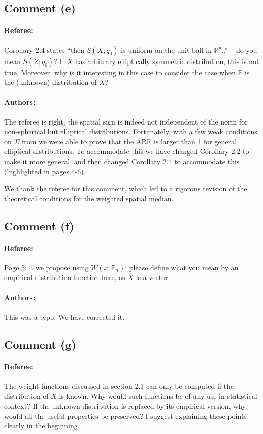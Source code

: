 \documentclass[11pt,letterpaper]{article}
\newcommand{\BF}{{\mathbb{F}}}
\newcommand{\BR}{{\mathbb{R}}}
\theoremstyle{definition} \newtheorem{Definition}[Theorem]{Definition}
\begin{document}
\subsection*{Comment (e)}
\paragraph{Referee:}
Corollary 2.4 states “then $S(X; q_0)$ is uniform on the unit ball in $\BR^p$..” – do you mean $S(Z; q_0)$? If $X$ has arbitrary elliptically symmetric distribution, this is not true. Moreover, why is it interesting in this case to consider the case when $\BF$ is the (unknown) distribution of $X$?

\paragraph{Authors:}
The referee is right, the spatial sign is indeed not independent of the norm for non-spherical but elliptical distributions. Fortunately, with a few weak conditions on $\Sigma$ from \cite{ref:JASA151658_WangPengLi} we were able to prove that the ARE is larger than 1 for general elliptical distributions. To accommodate this we have changed Corollary 2.2 to make it more general, and then changed Corollary 2.4 to accommodate this (highlighted in pages 4-6).

We thank the referee for this comment, which led to a rigorous revision of the theoretical conditions for the weighted spatial median.

\subsection*{Comment (f)}
\paragraph{Referee:}
Page 5: “..we propose using $W(x; \BF_n)$: please define what you mean by an empirical distribution function here, as $X$ is a vector.

\paragraph{Authors:}
This was a typo. We have corrected it.

\subsection*{Comment (g)}
\paragraph{Referee:}
The weight functions discussed in section 2.1 can only be computed if the distribution of $X$ is known. Why would such functions be of any use in statistical context? If the unknown distribution is replaced by its empirical version, why would all the useful properties be
preserved? I suggest explaining these points clearly in the beginning.
\end{document}
